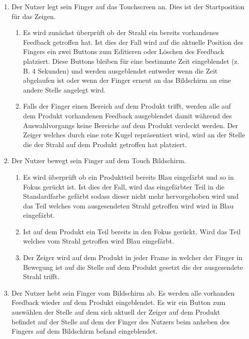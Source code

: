 \begin{enumerate}
	\item Der Nutzer legt sein Finger auf das Touchscreen an. Dies ist der Startposition für das Zeigen. 
	\begin{enumerate}
	\item Es wird zunächst überprüft ob der Strahl ein bereits vorhandenes Feedback getroffen hat. Ist dies der Fall wird auf die aktuelle Position des Fingers ein zwei Buttons zum Editieren oder Löschen des Feedback platziert. Diese Buttons bleiben für eine bestimmte Zeit eingeblendet (z. B. 4 Sekunden) und werden ausgeblendet entweder wenn die Zeit abgelaufen ist oder wenn der Finger erneut an das Bildschirm an eine andere Stelle angelegt wird. 
	\item Falls der Finger einen Bereich auf dem Produkt trifft, werden alle auf dem Produkt vorhandenen Feedback ausgeblendet damit während des Auswahlvorgangs keine Bereiche auf dem Produkt verdeckt werden. Der Zeiger welches durch eine rote Kugel repräsentiert wird, wird an der Stelle die der Strahl auf dem Produkt getroffen hat platziert.
	\end{enumerate} 
	\item Der Nutzer bewegt sein Finger auf dem Touch Bildschirm.
	\begin{enumerate}
		\item Es wird überprüft ob ein Produktteil bereits Blau eingefärbt und so in Fokus gerückt ist. Ist dies der Fall, wird das eingefärbter Teil in die Standardfarbe gefärbt sodass dieser nicht mehr hervorgehoben wird und das Teil welches vom ausgesendeten Strahl getroffen wird wird in Blau eingefärbt.
		\item Ist auf dem Produkt ein Teil bereits in den Fokus gerückt. Wird das Teil welches vom Strahl getroffen wird Blau eingefärbt.  
		\item Der Zeiger wird auf dem Produkt in jeder Frame in welcher der Finger in Bewegung ist auf die Stelle auf dem Produkt gesetzt die der ausgesendete Strahl trifft.
	\end{enumerate} 
	\item Der Nutzer hebt sein Finger vom Bildschirm ab. Es werden alle vorhanden Feedback wieder auf dem Produkt eingeblendet. Es wir ein Button zum auswählen der Stelle auf dem sich aktuell der Zeiger auf dem Produkt befindet auf der Stelle auf dem der Finger des Nutzers beim anheben des Fingers auf dem Bildschirm befand eingeblendet.
\end{enumerate} 

